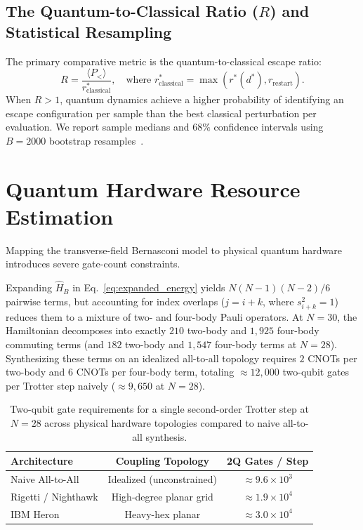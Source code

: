 \documentclass[12pt,a4paper]{report}
\begin{document}
\subsection{The Quantum-to-Classical Ratio \texorpdfstring{($R$)}{(R)} and Statistical Resampling}
The primary comparative metric is the quantum-to-classical escape ratio:
\begin{equation}
    R = \frac{\langle P_< \rangle}{r_{\mathrm{classical}}^*}, \quad \text{where } r_{\mathrm{classical}}^* = \max(r^*(d^*), r_{\mathrm{restart}}).
    \label{eq:ratio_r}
\end{equation}
When $R > 1$, quantum dynamics achieve a higher probability of identifying an escape configuration per sample than the best classical perturbation per evaluation. We report sample medians and $68\%$ confidence intervals using $B = 2000$ bootstrap resamples~\cite{efron1994}.

\section{Quantum Hardware Resource Estimation}
\label{sec:hardware_resources}
Mapping the transverse-field Bernasconi model to physical quantum hardware introduces severe gate-count constraints.

Expanding $\hat{H}_B$ in Eq.~\eqref{eq:expanded_energy} yields $N(N-1)(N-2)/6$ pairwise terms, but accounting for index overlaps ($j = i+k$, where $s_{i+k}^2 = 1$) reduces them to a mixture of two- and four-body Pauli operators. At $N = 30$, the Hamiltonian decomposes into exactly $210$ two-body and $1{,}925$ four-body commuting terms (and $182$ two-body and $1{,}547$ four-body terms at $N = 28$). Synthesizing these terms on an idealized all-to-all topology requires $2$ CNOTs per two-body and $6$ CNOTs per four-body term, totaling $\approx 12{,}000$ two-qubit gates per Trotter step naively ($\approx 9{,}650$ at $N = 28$).

\begin{table}[htbp]
\centering
\caption{Two-qubit gate requirements for a single second-order Trotter step at $N = 28$ across physical hardware topologies compared to naive all-to-all synthesis.}
\label{tab:hardware_transpilation}
\begin{tabular}{lcc}
\toprule
Architecture & Coupling Topology & 2Q Gates / Step \\
\midrule
Naive All-to-All & Idealized (unconstrained) & $\approx 9.6 \times 10^3$ \\
Rigetti / Nighthawk & High-degree planar grid & $\approx 1.9 \times 10^4$ \\
IBM Heron & Heavy-hex planar & $\approx 3.0 \times 10^4$ \\
\bottomrule
\end{tabular}
\end{table}
\end{document}
